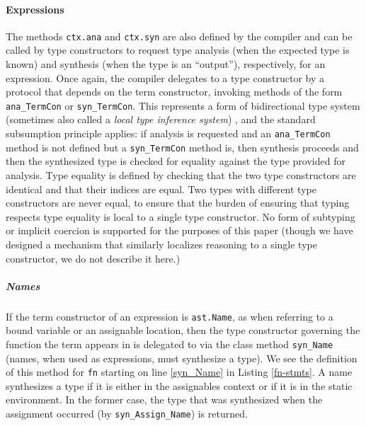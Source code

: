 \documentclass[9pt]{sigplanconf}
\newcommand{\lstinlinep}[1]{\lstinline[language=Python,basicstyle=\ttfamily\small,deletendkeywords={tuple,buffer,map}]{#1}}
\begin{document}

\paragraph{Expressions} The methods \lstinlinep{ctx.ana} and \lstinlinep{ctx.syn} are also defined by the compiler and can be called by type constructors to request type analysis (when the expected type is known) and synthesis (when the type is an ``output''), respectively, for an expression. Once again, the compiler delegates to a type constructor by a protocol that depends on the term constructor, invoking methods of the form \lstinlinep{ana_TermCon} or \lstinlinep{syn_TermCon}. This represents a form of bidirectional type system (sometimes also called a \emph{local type inference system}) \cite{Pierce:2000:LTI:345099.345100}, and the standard subsumption principle applies: if analysis is requested and an \lstinlinep{ana_TermCon} method is not defined but a \lstinlinep{syn_TermCon} method is, then synthesis proceeds and then the synthesized type is checked for equality against the type provided for analysis. Type equality is defined by checking that the two type constructors are identical and that their indices are equal. Two types with different type constructors are never equal, to ensure that the burden of ensuring that typing respects type equality is local to a single type constructor.  No form of subtyping or implicit coercion is supported for the purposes of this paper (though we have designed a mechanism that similarly localizes reasoning to a single type constructor, we do not  describe it here.)

\subparagraph{Names} If the term constructor of an expression is \lstinlinep{ast.Name}, as when referring to a bound variable or an assignable location, then the type constructor governing the function the term appears in is delegated to via the class method \lstinlinep{syn_Name} (names, when used as expressions, must synthesize a type). We see the definition of this method for \lstinlinep{fn} starting on line \ref{syn_Name} in Listing \ref{fn-stmts}. A name synthesizes a type if it is either in the assignables context or if it is in the static environment. In the former case, the type that was synthesized when the assignment occurred (by \lstinlinep{syn_Assign_Name}) is returned. 
\end{document}
